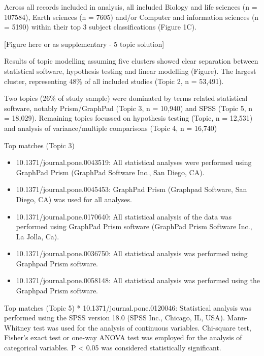 \documentclass[
]{article}
\providecommand{\tightlist}{%
  \setlength{\itemsep}{0pt}\setlength{\parskip}{0pt}}
\begin{document}
Across all records included in analysis, all included Biology and life
sciences (n = 107584), Earth sciences (n = 7605) and/or Computer and
information sciences (n = 5190) within their top 3 subject
classifications (Figure 1C).

{[}Figure here or as supplementary - 5 topic solution{]}

Results of topic modelling assuming five clusters showed clear
separation between statistical software, hypothesis testing and linear
modelling (Figure). The largest cluster, representing 48\% of all
included studies (Topic 2, n = 53,491).

Two topics (26\% of study sample) were dominated by terms related
statistical software, notably Prism/GraphPad (Topic 3, n = 10,940) and
SPSS (Topic 5, n = 18,029). Remaining topics focussed on hypothesis
testing (Topic, n = 12,531) and analysis of variance/multiple
comparisons (Topic 4, n = 16,740)

Top matches (Topic 3)

\begin{itemize}
\tightlist
\item
  10.1371/journal.pone.0043519: All statistical analyses were performed
  using GraphPad Prism (GraphPad Software Inc., San Diego, CA).
\item
  10.1371/journal.pone.0045453: GraphPad Prism (Graphpad Software, San
  Diego, CA) was used for all analyses.
\item
  10.1371/journal.pone.0170640: All statistical analysis of the data was
  performed using GraphPad Prism software (GraphPad Prism Software Inc.,
  La Jolla, Ca).
\item
  10.1371/journal.pone.0036750: All statistical analysis was performed
  using Graphpad Prism software.
\item
  10.1371/journal.pone.0058148: All statistical analysis was performed
  using the Graphpad Prism software.
\end{itemize}

Top matches (Topic 5) * 10.1371/journal.pone.0120046: Statistical
analysis was performed using the SPSS version 18.0 (SPSS Inc., Chicago,
IL, USA). Mann-Whitney test was used for the analysis of continuous
variables. Chi-square test, Fisher's exact test or one-way ANOVA test
was employed for the analysis of categorical variables. P \textless{}
0.05 was considered statistically significant.
\end{document}
